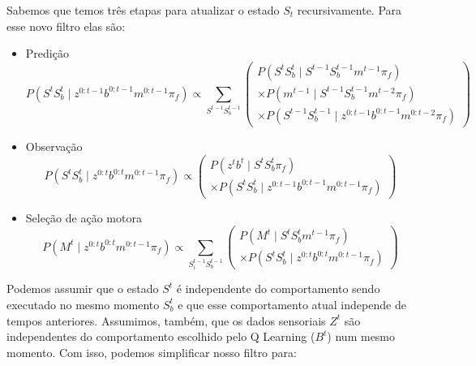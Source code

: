 Sabemos que temos três etapas para atualizar o estado $ S_t $ recursivamente. Para esse novo filtro elas são:

\begin{itemize}
	\item Predição
		\begin{equation}
    P \left( S^t S_b^t \mid z^{0: t-1} b^{0: t-1} m^{0: t-1} \pi_f \right) \propto \sum\limits_{S^{t-1} S_b^{t-1}}
        \left(
            \begin{array}{l}
                P \left( S^t S_b^t \mid S^{t-1} S_b^{t-1}  m^{t-1} \pi_f \right) \\
                \times P \left( m^{t-1} \mid S^{t-1} S_b^{t-1} m^{t-2} \pi_f \right)\\
                \times P \left( S^{t-1} S_b^{t-1} \mid z^{0: t-1} b^{0: t-1} m^{0: t-2} \pi_f \right)
            \end{array}
        \right)
		\end{equation}
	\item Observação
		\begin{equation}
    P \left( S^t S_b^t \mid z^{0: t} b^{0: t} m^{0: t-1} \pi_f \right) \propto
        \left(
            \begin{array}{l}
                P \left( z^t b^t \mid S^t S_b^t \pi_f \right) \\
                \times P \left( S^t S_b^t \mid z^{0: t-1} b^{0: t-1} m^{0: t-1} \pi_f \right)
            \end{array}
        \right)
		\end{equation}
	\item Seleção de ação motora
		\begin{equation}
    P \left( M^t \mid z^{0: t} b^{0: t} m^{0: t-1} \pi_f \right) \propto \sum\limits_{S_i^{t-1} S_b^{t-1}}
        \left(
            \begin{array}{l}
                P \left( M^t \mid S^t S_b^t m^{t-1} \pi_f \right)\\
                \times P \left( S^t S_b^t \mid z^{0: t} b^{0: t} m^{0: t-1} \pi_f \right)
            \end{array}
        \right)
		\end{equation}
\end{itemize}

Podemos assumir que o estado $ S^t $ é independente do comportamento sendo executado no mesmo momento $ S_b^t $ e que esse comportamento atual independe de tempos anteriores. Assumimos, também, que os dados sensoriais $ Z^t $ são independentes do comportamento escolhido pelo Q Learning ($ B^t $) num mesmo momento. Com isso, podemos simplificar nosso filtro para:

